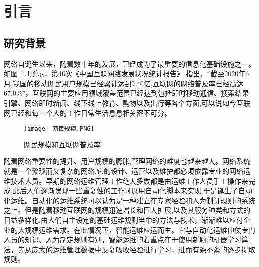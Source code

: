 
\chapter{引言}


\section{研究背景}

网络自诞生以来，随着数十年的发展，已经成为了最重要的信息化基础设施之一。如图~\ref{fig:网民规模和互联网普及率}所示，第46次《中国互联网络发展状况统计报告》\cite{cac.gov} 指出，“截至2020年6月,我国的移动网民用户规模已经累计达到9.40亿,互联网的网络普及率已经高达67.0\%”。互联网的主要应用领域覆盖范围已经达到包括即时移动通信、搜索结果引擎、网络即时新闻、线下线上教育、购物以及出行等各个方面,可以说如今互联网已经和每一个人的工作日常生活息息相关密不可分。



\begin{figure}
    \centering
    \texttt{[image: 网民规模.PNG]}
    \caption{网民规模和互联网普及率}
    \label{fig:网民规模和互联网普及率}
  \end{figure}

随着网络重要性的提升、用户规模的膨胀,管理网络的难度也越来越大。网络系统就是一个繁琐而又复杂的网络,它的设计、运营以及维护都必须依靠专业的网络运维技术人员。早期的网络运维管理工作绝大多数都是由运维工作人员手工操作来完成,此后人们逐渐发现一些重复性的工作可以用自动化脚本来实现,于是诞生了自动化运维。自动化的运维系统可以认为是一种建立在专家经验和人为制订规则的系统之上。但是随着移动互联网的规模迅速增长和巨大扩展,以及其服务种类和方式的日益多样化,由人们自主设定的基础运维规则当中的方法与技术，渐渐难以应付企业的大规模运维需求。在此情况下，智能运维应运而生。它与自动化运维仰仗专门人员的知识、人为制定规则有别，智能运维的着重点在于使用新颖的机器学习算法，先从庞大的运维管理数据中反复吸收经验进行学习，进而有条不紊的逐步提取规则。


